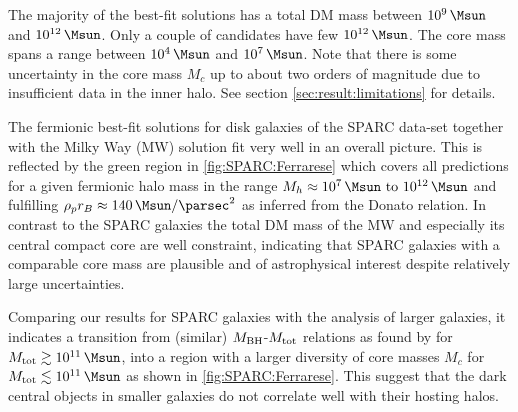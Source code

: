 The majority of the best-fit solutions has a total DM mass between $\SI{E9}{\Msun}$ and $\SI{E12}{\Msun}$. Only a couple of  candidates have few $\SI{E12}{\Msun}$. The core mass spans a range between $\SI{E4}{\Msun}$ and $\SI{E7}{\Msun}$. Note that there is some uncertainty in the core mass $M_c$ up to about two orders of magnitude due to insufficient data in the inner halo. See section \ref{sec:result:limitations} for details.

The fermionic best-fit solutions for disk galaxies of the SPARC data-set together with the Milky Way (MW) solution \citep{2018PDU....21...82A} fit very well in an overall picture. This is reflected by the green region in \cref{fig:SPARC:Ferrarese} which covers all predictions for a given fermionic halo mass in the range $M_h \approx \SIrange{E7}{E12}{\Msun}$ and fulfilling $\rho_p r_B \approx \SI{140}{\Msun\per\parsec^2}$ as inferred from the Donato relation. In contrast to the SPARC galaxies the total DM mass of the MW and especially its central compact core are well constraint, indicating that SPARC galaxies with a comparable core mass are plausible and of astrophysical interest despite relatively large uncertainties.

Comparing our results for SPARC galaxies with the analysis of larger galaxies, it indicates a transition from (similar) $M_{\rm BH}$-$M_{\rm tot}$ relations as found by \citet{2002ApJ...578...90F,2015ApJ...800..124B} for $M_{\rm tot} \gtrsim \SI{E11}{\Msun}$, into a region with a larger diversity of core masses $M_c$ for $M_{\rm tot} \lesssim \SI{E11}{\Msun}$ as shown in \cref{fig:SPARC:Ferrarese}. This suggest that the dark central objects in smaller galaxies do not correlate well with their hosting halos.
